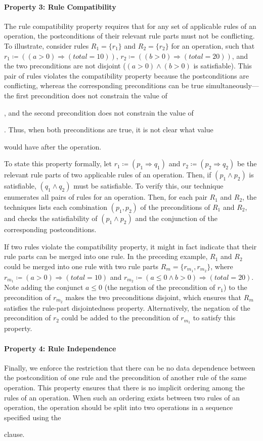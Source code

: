 \paragraph*{Property 3: Rule Compatibility}
The rule compatibility property requires that for any set of applicable rules of
an operation, the postconditions of their relevant rule parts must not be
conflicting. To illustrate, consider rules $R_1 = \{r_1\}$ and $R_2 = \{r_2\}$
for an operation, such that $r_1 \coloneqq ((a > 0) \Longrightarrow (total =
10))$, $r_2 \coloneqq ((b > 0) \Longrightarrow (total = 20))$, and the two
preconditions are not disjoint (\ie $(a > 0) \wedge (b > 0)$ is
satisfiable). This pair of rules violates the compatibility property because the
postconditions are conflicting, whereas the corresponding preconditions can be
true simultaneously---the first precondition does not constrain the value of
\subject{b}, and the second precondition does not constrain the value of
\subject{a}. Thus, when both preconditions are true, it is not clear what value
\subject{total} would have after the operation.

To state this property formally, let $r_1 \coloneqq (p_1 \Longrightarrow q_1)$
and $r_2 \coloneqq (p_2 \Longrightarrow q_2)$ be the relevant rule parts of two
applicable rules of an operation. Then, if $(p_1 \wedge p_2)$ is satisfiable,
$(q_1 \wedge q_2)$ must be satisfiable. To verify this, our technique enumerates
all pairs of rules for an operation. Then, for each pair $R_1$ and $R_2$, the
techniques lists each combination $(p_1, p_2)$ of the preconditions of $R_1$ and
$R_2$, and checks the satisfiability of $(p_1 \wedge p_2)$ and the conjunction
of the corresponding postconditions.

If two rules violate the compatibility property, it might in fact indicate that
their rule parts can be merged into one rule. In the preceding example, $R_1$
and $R_2$ could be merged into one rule with two rule parts $R_m = \{r_{m_1},
r_{m_2}\}$, where $r_{m_1} \coloneqq (a > 0) \Longrightarrow (total = 10)$ and
$r_{m_2} \coloneqq (a \leq 0 \wedge b > 0) \Longrightarrow (total = 20)$. Note
adding the conjunct $a \leq 0$ (the negation of the precondition of $r_1$) to
the precondition of $r_{m_2}$ makes the two preconditions disjoint, which
ensures that $R_m$ satisfies the rule-part disjointedness
property. Alternatively, the negation of the precondition of $r_2$ could be
added to the precondition of $r_{m_1}$ to satisfy this property.

\paragraph*{Property 4: Rule Independence}
Finally, we enforce the restriction that there can be no data dependence between
the postcondition of one rule and the precondition of another rule of the same
operation. This property ensures that there is no implicit ordering among the
rules of an operation. When such an ordering exists between two rules of an
operation, the operation should be split into two operations in a sequence
specified using the \subject{next} clause.

